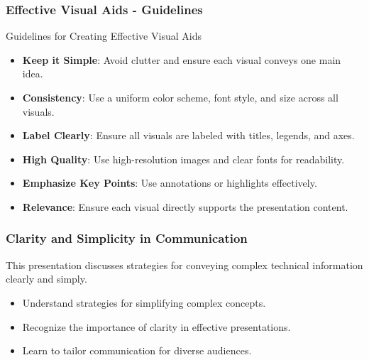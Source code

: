\documentclass[aspectratio=169]{beamer}
\begin{document}
\begin{frame}[fragile]
    \frametitle{Effective Visual Aids - Guidelines}
    \begin{block}{Guidelines for Creating Effective Visual Aids}
        \begin{itemize}
            \item \textbf{Keep it Simple}: Avoid clutter and ensure each visual conveys one main idea.
            \item \textbf{Consistency}: Use a uniform color scheme, font style, and size across all visuals.
            \item \textbf{Label Clearly}: Ensure all visuals are labeled with titles, legends, and axes.
            \item \textbf{High Quality}: Use high-resolution images and clear fonts for readability.
            \item \textbf{Emphasize Key Points}: Use annotations or highlights effectively.
            \item \textbf{Relevance}: Ensure each visual directly supports the presentation content.
        \end{itemize}
    \end{block}
\end{frame}

\begin{frame}[fragile]
    \frametitle{Clarity and Simplicity in Communication}
    This presentation discusses strategies for conveying complex technical information clearly and simply.
    \begin{itemize}
        \item Understand strategies for simplifying complex concepts.
        \item Recognize the importance of clarity in effective presentations.
        \item Learn to tailor communication for diverse audiences.
    \end{itemize}
\end{frame}
\end{document}
